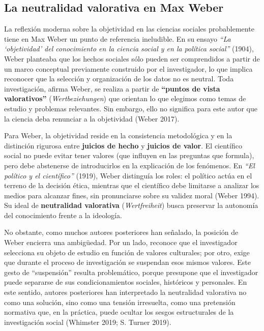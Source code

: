 \documentclass[
  spanish,
  letterpaper,
  DIV=11,
  numbers=noendperiod]{scrreprt}
\begin{document}
\subsection{La neutralidad valorativa en Max
Weber}\label{la-neutralidad-valorativa-en-max-weber}

La reflexión moderna sobre la objetividad en las ciencias sociales
probablemente tiene en Max Weber un punto de referencia ineludible. En
su ensayo \emph{``La `objetividad' del conocimiento en la ciencia social
y en la política social''} (1904), Weber planteaba que los hechos
sociales sólo pueden ser comprendidos a partir de un marco conceptual
previamente construido por el investigador, lo que implica reconocer que
la selección y organización de los datos no es neutral. Toda
investigación, afirma Weber, se realiza a partir de \textbf{``puntos de
vista valorativos''} (\emph{Wertbeziehungen}) que orientan lo que
elegimos como temas de estudio y problemas relevantes. Sin embargo, ello
no significa para este autor que la ciencia deba renunciar a la
objetividad (Weber 2017).

Para Weber, la objetividad reside en la consistencia metodológica y en
la distinción rigurosa entre \textbf{juicios de hecho} y \textbf{juicios
de valor}. El científico social no puede evitar tener valores (que
influyen en las preguntas que formula), pero debe abstenerse de
introducirlos en la explicación de los fenómenos. En \emph{``El político
y el científico''} (1919), Weber distinguía los roles: el político actúa
en el terreno de la decisión ética, mientras que el científico debe
limitarse a analizar los medios para alcanzar fines, sin pronunciarse
sobre su validez moral (Weber 1994). Su ideal de \textbf{neutralidad
valorativa} (\emph{Wertfreiheit}) busca preservar la autonomía del
conocimiento frente a la ideología.

No obstante, como muchos autores posteriores han señalado, la posición
de Weber encierra una ambigüedad. Por un lado, reconoce que el
investigador selecciona su objeto de estudio en función de valores
culturales; por otro, exige que durante el proceso de investigación se
suspendan esos mismos valores. Este gesto de ``suspensión'' resulta
problemático, porque presupone que el investigador puede separarse de
sus condicionamientos sociales, históricos y personales. En este
sentido, autores posteriores han interpretado la neutralidad valorativa
no como una solución, sino como una tensión irresuelta, como una
pretensión normativa que, en la práctica, puede ocultar los sesgos
estructurales de la investigación social (Whimster 2019; S. Turner
2019).
\end{document}
